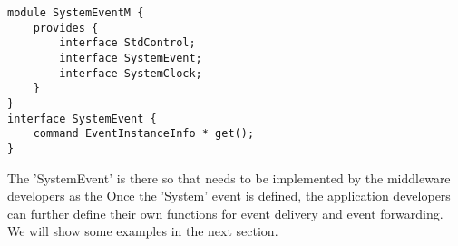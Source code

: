 \begin{lstlisting}[caption=API of the 'System' event, label=lst:systemEvent]
module SystemEventM {
	provides {
		interface StdControl;
		interface SystemEvent;
		interface SystemClock;
	}
}
interface SystemEvent {
	command EventInstanceInfo * get();
}
\end{lstlisting}

The 'SystemEvent' is there so that needs to be implemented by the middleware developers as the  Once the 'System' event is defined, the application developers can further define their own functions for event delivery and event forwarding. We will show some examples in the next section. 